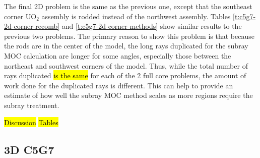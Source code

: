 The final 2D problem is the same as the previous one, except that the southeast corner UO$_2$ assembly is rodded instead of the northwest assembly.  Tables \ref{t:c5g7-2d-corner-recomb} and \ref{t:c5g7-2d-corner-methods} show similar results to the previous two problems.  The primary reason to show this problem is that because the rods are in the center of the model, the long rays duplicated for the subray MOC calculation are longer for some angles, especially those between the northeast and southwest corners of the model.  Thus, while the total number of rays duplicated \hl{is the same} for each of the 2 full core problems, the amount of work done for the duplicated rays is different.  This can help to provide an estimate of how well the subray MOC method scales as more regions require the subray treatment.

\hl{Discussion}
\hl{Tables}

\subsection{3D C5G7}